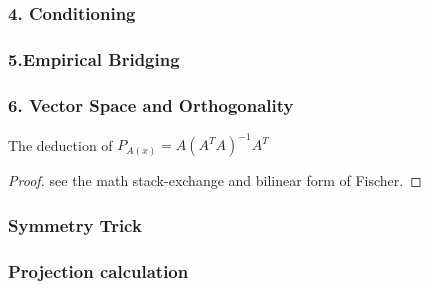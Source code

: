 \subsubsection*{4. Conditioning}

\subsubsection*{5.Empirical Bridging}

\subsubsection*{6. Vector Space and Orthogonality}
\begin{theorem}
	The deduction of $P_{A(x)} = A(A^T A)^{-1} A^T$
\end{theorem}
\begin{proof}
	see the math stack-exchange and bilinear form of Fischer. 
\end{proof}



\subsubsection*{Symmetry Trick}

\subsubsection*{Projection calculation}











